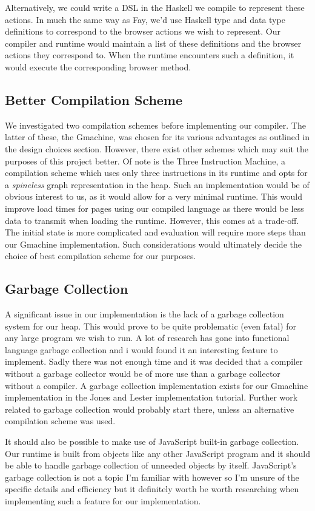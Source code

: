 Alternatively, we could write a DSL in the Haskell we compile to
represent these actions. In much the same way as Fay, we'd use Haskell
type and data type definitions to correspond to the browser actions
we wish to represent. Our compiler and runtime would maintain a list
of these definitions and the browser actions they correspond to. When
the runtime encounters such a definition, it would execute the corresponding
browser method.

\subsection{Better Compilation Scheme}
We investigated two compilation schemes before implementing our compiler.
The latter of these, the Gmachine, was chosen for its various advantages
as outlined in the design choices section. However, there exist other
schemes which may suit the purposes of this project better. Of note is
the Three Instruction Machine, a compilation scheme which uses only
three instructions in its runtime and opts for a \emph{spineless} graph 
representation in the heap. Such an implementation would be of obvious
interest to us, as it would allow for a very minimal runtime. This would
improve load times for pages using our compiled language as there would
be less data to transmit when loading the runtime. However, this comes
at a trade-off. The initial state is more complicated and evaluation will
require more steps than our Gmachine implementation. Such considerations
would ultimately decide the choice of best compilation scheme for our
purposes. 

\subsection{Garbage Collection}
A significant issue in our implementation is the lack of a garbage collection
system for our heap. This would prove to be quite problematic (even fatal)
for any large program we wish to run. A lot of research has gone into
functional language garbage collection and i would found it an interesting
feature to implement. Sadly there was not enough time and it was decided
that a compiler without a garbage collector would be of more use than a 
garbage collector without a compiler. A garbage collection implementation
exists for our Gmachine implementation in the Jones and Lester implementation
tutorial. Further work related to garbage collection would probably start
there, unless an alternative compilation scheme was used. 

It should also be possible to make use of JavaScript built-in garbage
collection. Our runtime is built from objects like any other JavaScript
program and it should be able to handle garbage collection of unneeded
objects by itself. JavaScript's garbage collection is not a topic I'm 
familiar with however so I'm unsure of the specific details and efficiency
but it definitely worth be worth researching when implementing such a
feature for our implementation.
